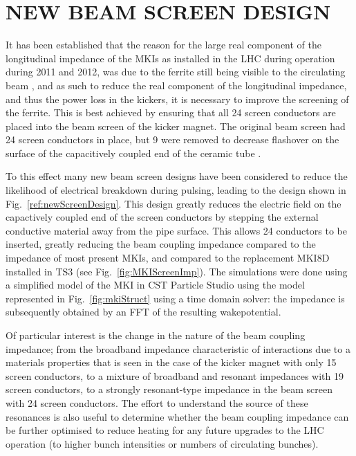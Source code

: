 \documentclass{JAC2003}
\begin{document}
\section{NEW BEAM SCREEN DESIGN}

It has been established that the reason for the large real component of the longitudinal impedance of the MKIs as installed in the LHC during operation during 2011 and 2012, was due to the ferrite still being visible to the circulating beam \cite{kicker_meas}, and as such to reduce the real component of the longitudinal impedance, and thus the power loss in the kickers, it is necessary to improve the screening of the ferrite. This is best achieved by ensuring that all 24 screen conductors are placed into the beam screen of the kicker magnet. The original beam screen had 24 screen conductors in place, but 9 were removed to decrease flashover on the surface of the capacitively coupled end of the ceramic tube \cite{mki-ElecBreakdown}. 

To this effect many new beam screen designs have been considered to reduce the likelihood of electrical breakdown during pulsing, leading to the design shown in Fig.~\ref{ref:newScreenDesign}. This design greatly reduces the electric field on the capactively coupled end of the screen conductors by stepping the external conductive material away from the pipe surface. This allows 24 conductors to be inserted, greatly reducing the beam coupling impedance compared to the impedance of most present MKIs, and compared to the replacement MKI8D installed in TS3 (see Fig.~\ref{fig:MKIScreenImp}). The simulations were done using a simplified model of the MKI in CST Particle Studio \cite{cst-cite} using the model represented in Fig.~\ref{fig:mkiStruct} using a time domain solver: the impedance is subsequently obtained by an FFT of the resulting wakepotential. 

Of particular interest is the change in the nature of the beam coupling impedance; from the broadband impedance characteristic of interactions due to a materials properties that is seen in the case of the kicker magnet with only 15 screen conductors, to a mixture of broadband and resonant impedances with 19 screen conductors, to a strongly resonant-type impedance in the beam screen with 24 screen conductors. The effort to understand the source of these resonances is also useful to determine whether the beam coupling impedance can be further optimised to reduce heating for any future upgrades to the LHC operation (to higher bunch intensities or numbers of circulating bunches).
\end{document}
